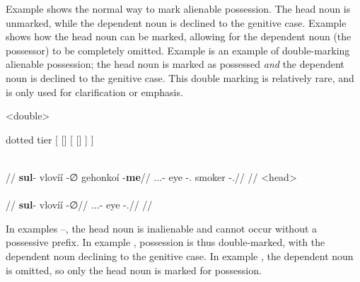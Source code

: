 Example  shows the normal way to mark alienable possession. The head noun  is unmarked, while the dependent noun  is declined to the genitive case. Example  shows how the head noun  can be marked, allowing for the dependent noun (the possessor) to be completely omitted. Example  is an example of double-marking alienable possession; the head noun  is marked as possessed \emph{and} the dependent noun  is declined to the genitive case. This double marking is relatively rare, and is only used for clarification or emphasis.

	\a<double>\begingl
		\glpreamble{}\\
		\begin{forest} dotted tier
			[
				[]
				[
					[]
				]
			]
		\end{forest}\\
		//
		\gla \textbf{sul}- vlovíí -∅ gehonkoí -\textbf{me}//
		\glb \Tps.\Prox.\Poss.\Inal- eye -\Dir.\Sg{} smoker -\Gen.\Sg//
		\glft {}//
	\endgl
	\a<head>\begingl
		\glpreamble{}\\
		\\
		//
		\gla \textbf{sul}- vlovíí -∅//
		\glb \Tps.\Prox.\Poss.\Inal- eye -\Dir.\Sg//
		\glft {}//
	\endgl
\xe

In examples --, the head noun  is inalienable and cannot occur without a possessive prefix. In example , possession is thus double-marked, with the dependent noun  declining to the genitive case. In example , the dependent noun is omitted, so only the head noun is marked for possession.


